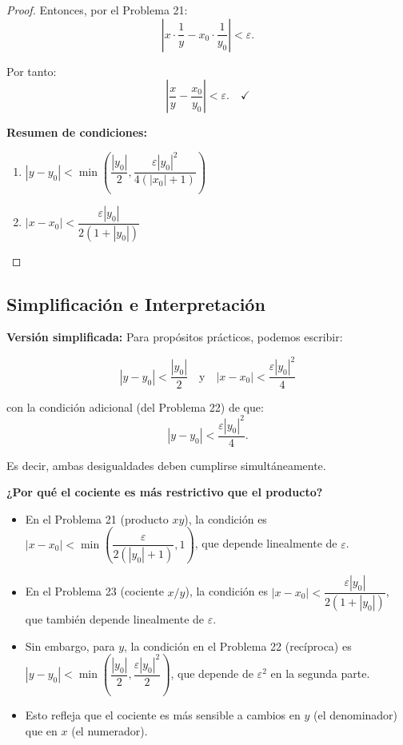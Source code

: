 \begin{proof}
Entonces, por el Problema 21:
\[
\left|x \cdot \frac{1}{y} - x_0 \cdot \frac{1}{y_0}\right| < \varepsilon.
\]

Por tanto:
\[
\left|\frac{x}{y} - \frac{x_0}{y_0}\right| < \varepsilon. \quad \checkmark
\]

\textbf{Resumen de condiciones:}

\begin{enumerate}
\item $|y - y_0| < \min\left(\dfrac{|y_0|}{2}, \dfrac{\varepsilon|y_0|^2}{4(|x_0|+1)}\right)$
\item $|x - x_0| < \dfrac{\varepsilon|y_0|}{2(1+|y_0|)}$
\end{enumerate}

\end{proof}

\subsection*{Simplificación e Interpretación}

\textbf{Versión simplificada:} Para propósitos prácticos, podemos escribir:

\[
\boxed{|y - y_0| < \frac{|y_0|}{2} \quad \text{y} \quad |x - x_0| < \frac{\varepsilon|y_0|^2}{4}}
\]

con la condición adicional (del Problema 22) de que:
\[
|y - y_0| < \frac{\varepsilon|y_0|^2}{4}.
\]

Es decir, ambas desigualdades deben cumplirse simultáneamente.

\textbf{¿Por qué el cociente es más restrictivo que el producto?}

\begin{itemize}
\item En el Problema 21 (producto $xy$), la condición es $|x - x_0| < \min\left(\dfrac{\varepsilon}{2(|y_0|+1)}, 1\right)$, que depende linealmente de $\varepsilon$.

\item En el Problema 23 (cociente $x/y$), la condición es $|x - x_0| < \dfrac{\varepsilon|y_0|}{2(1+|y_0|)}$, que también depende linealmente de $\varepsilon$.

\item Sin embargo, para $y$, la condición en el Problema 22 (recíproca) es $|y - y_0| < \min\left(\dfrac{|y_0|}{2}, \dfrac{\varepsilon|y_0|^2}{2}\right)$, que depende de $\varepsilon^2$ en la segunda parte.

\item Esto refleja que el cociente es más sensible a cambios en $y$ (el denominador) que en $x$ (el numerador).
\end{itemize}

